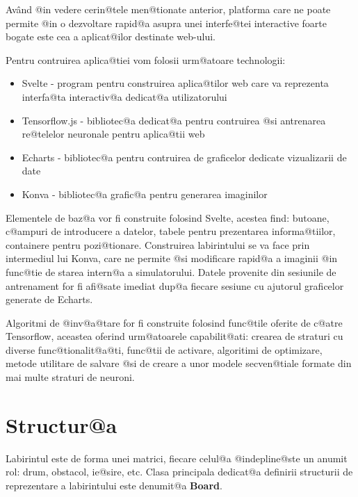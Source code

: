 Av\^ and @in vedere cerin@tele men@tionate anterior, platforma care ne poate permite @in o dezvoltare rapid@a asupra unei interfe@tei interactive foarte bogate este cea a aplicat@ilor destinate web-ului.

Pentru contruirea aplica@tiei vom folosii urm@atoare technologii:

\begin{itemize}
	\item Svelte - program pentru construirea aplica@tilor web care va reprezenta interfa@ta interactiv@a dedicat@a utilizatorului \cite{Svelte}
	\item Tensorflow.js - bibliotec@a dedicat@a pentru contruirea @si antrenarea re@telelor neuronale pentru aplica@tii web \cite{TensorflowJs}
	\item Echarts - bibliotec@a pentru contruirea de graficelor dedicate vizualizarii de date \cite{Echarts}
	\item Konva - bibliotec@a grafic@a pentru generarea imaginilor \cite{Konva}
\end{itemize} 

Elementele de baz@a vor fi construite folosind Svelte, acestea find: butoane, c@ampuri de introducere a datelor, tabele pentru prezentarea informa@tiilor, containere pentru pozi@tionare. Construirea labirintului se va face prin intermediul lui Konva, care ne permite @si modificare rapid@a a imaginii @in func@tie de starea intern@a a simulatorului. Datele provenite din sesiunile de antrenament for fi afi@sate imediat dup@a fiecare sesiune cu ajutorul graficelor generate de Echarts.

Algoritmi de @inv@a@tare for fi construite folosind func@tile oferite de c@atre Tensorflow, aceastea oferind urm@atoarele capabilit@ati: crearea de straturi cu diverse func@tionalit@a@ti, func@tii de activare, algoritimi de optimizare, metode utilitare de salvare @si de creare a unor modele secven@tiale formate din mai multe straturi de neuroni.

\section{Structur@a}





Labirintul este de forma unei matrici, fiecare celul@a @indepline@ste un anumit rol: drum, obstacol, ie@sire, etc. Clasa principala dedicat@a definirii structurii de reprezentare a labirintului este denumit@a \textbf{Board}. 

